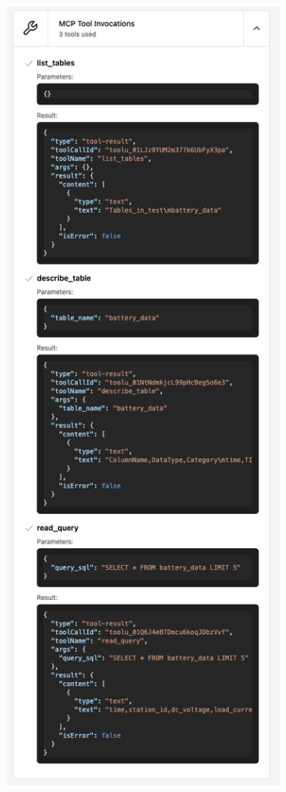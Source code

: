 \begin{figure}[htbp]
  \centering
  \begin{subfigure}{0.48\textwidth}
    \centering
    \includegraphics[width=\textwidth]{figures/screenshots/iotdb-demo/mcp-call.png}

\end{subfigure}
\end{figure}
